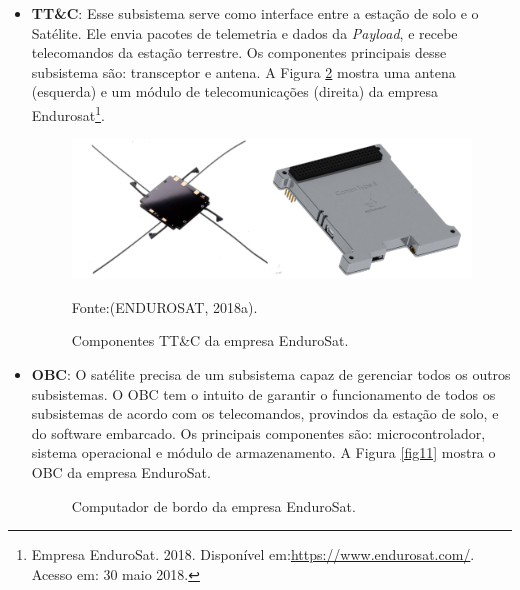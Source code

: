 \begin{itemize}
\begin{figure}[h]
	Fonte: (CLYDE SPACE, 2018, pág.1).\linebreak
	
	\label{fig09}
\end{figure}

    \item \textbf{TT\&C}: Esse subsistema serve como interface entre a estação de solo e o Satélite. Ele envia pacotes de telemetria e dados da \textit{Payload}, e recebe telecomandos da estação terrestre. Os componentes principais desse subsistema são: transceptor e antena. A Figura \ref{fig10} mostra uma antena (esquerda) e um módulo de telecomunicações (direita) da empresa Endurosat\footnote{Empresa EnduroSat. 2018. Disponível em:\url{https://www.endurosat.com/}. Acesso em: 30 maio 2018.}.

\begin{figure}[h]
	\centering
    \caption{Componentes TT\&C da empresa EnduroSat.}
    
	\includegraphics[keepaspectratio=true,scale=2.2]{figuras/tt_c.png}
	
	Fonte:(ENDUROSAT, 2018a).\linebreak
	
	\label{fig10}
\end{figure}

\newpage
    \item \textbf{OBC}: O satélite precisa de um subsistema capaz de gerenciar todos os outros subsistemas. O OBC tem o intuito de garantir o funcionamento de todos os subsistemas de acordo com os telecomandos, provindos da estação de solo, e do software embarcado. Os principais componentes são: microcontrolador, sistema operacional e módulo de armazenamento.  A Figura \ref{fig11} mostra o OBC da empresa EnduroSat.

\begin{figure}[h]
	\centering
  	
  	\caption{Computador de bordo da empresa EnduroSat.}
  	

\end{figure}
\end{itemize}
